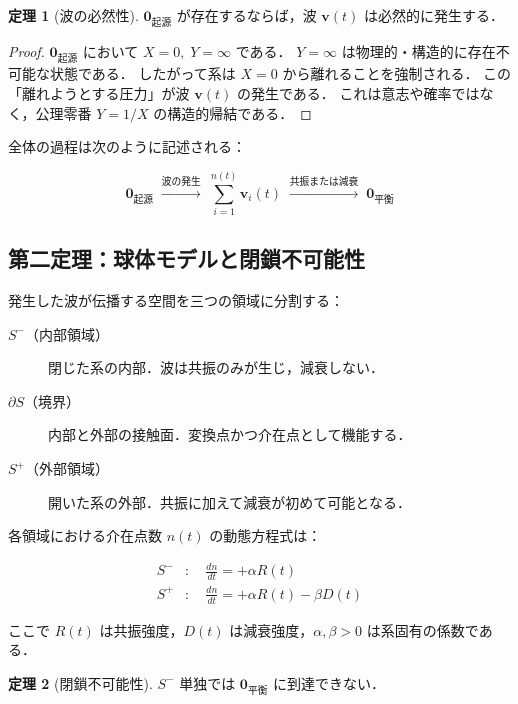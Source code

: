 \documentclass[12pt, a4paper]{article}
\theoremstyle{definition}
\newtheorem{theorem}{定理}
\newcommand{\vorigin}{\mathbf{0}_{\text{起源}}}
\newcommand{\vequil}{\mathbf{0}_{\text{平衡}}}
\begin{document}
\begin{theorem}[波の必然性]
  $\vorigin$ が存在するならば，波 $\mathbf{v}(t)$ は必然的に発生する．
\end{theorem}

\begin{proof}
  $\vorigin$ において $X = 0,\; Y = \infty$ である．
  $Y = \infty$ は物理的・構造的に存在不可能な状態である．
  したがって系は $X = 0$ から離れることを強制される．
  この「離れようとする圧力」が波 $\mathbf{v}(t)$ の発生である．
  これは意志や確率ではなく，公理零番 $Y = 1/X$ の構造的帰結である．
\end{proof}

全体の過程は次のように記述される：

\begin{equation}
  \vorigin
  \;\xrightarrow{\text{波の発生}}\;
  \sum_{i=1}^{n(t)} \mathbf{v}_i(t)
  \;\xrightarrow{\text{共振または減衰}}\;
  \vequil
  \label{eq:main_process}
\end{equation}

\subsection{第二定理：球体モデルと閉鎖不可能性}

発生した波が伝播する空間を三つの領域に分割する：

\begin{description}
  \item[$S^-$（内部領域）] 閉じた系の内部．波は共振のみが生じ，減衰しない．
  \item[$\partial S$（境界）] 内部と外部の接触面．変換点かつ介在点として機能する．
  \item[$S^+$（外部領域）] 開いた系の外部．共振に加えて減衰が初めて可能となる．
\end{description}

各領域における介在点数 $n(t)$ の動態方程式は：

\begin{align}
  S^-&: \quad \frac{dn}{dt} = +\alpha R(t)
  \label{eq:inside} \\[4pt]
  S^+&: \quad \frac{dn}{dt} = +\alpha R(t) - \beta D(t)
  \label{eq:outside}
\end{align}

ここで $R(t)$ は共振強度，$D(t)$ は減衰強度，$\alpha, \beta > 0$ は系固有の係数である．

\begin{theorem}[閉鎖不可能性]
  $S^-$ 単独では $\vequil$ に到達できない．
\end{theorem}
\end{document}
